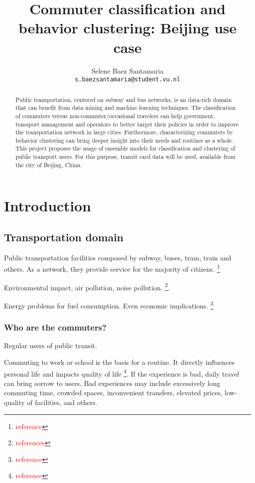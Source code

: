 \documentclass{article}
\title{Commuter classification and behavior clustering: Beijing use case}
\author{
  Selene Baez  Santamaria \\
  \texttt{s.baezsantamaria@student.vu.nl}
}
\newcommand{\selfnote}[1]{\footnote{\textcolor{red}{#1}}}
\begin{document}

\maketitle

\begin{abstract}
  Public transportation, centered on subway and bus networks, is an data-rich domain that can benefit from data mining and machine learning techniques. The classification of commuters versus non-commuter/occasional travelers can help government, transport management and operators to better target their policies in order to improve the transportation network in large cities. Furthermore, characterizing commuters by behavior clustering can bring deeper insight into their needs and routines as a whole. 
  This project proposes the usage of ensemble models for classification and clustering of public transport users. For this purpose, transit card data will be used, available from the city of Beijing, China. 
\end{abstract}

\newpage

\tableofcontents

\newpage
\section{Introduction}

\subsection{Transportation domain}
Public transportation facilities composed by subway, buses, tram, train and others. As a network, they provide service for the majority of citizens. \selfnote{reference}  

Environmental impact, air pollution, noise pollution. \selfnote{references}. 

Energy problems for fuel consumption. Even economic implications. \selfnote{reference}


\subsubsection{Who are the commuters?}
Regular users of public transit. 

Commuting to work or school is the basis for a routine. It directly influences personal life and impacts quality of life \selfnote{reference}. If the experience is bad, daily travel can bring sorrow to users. Bad experiences may include excessively long commuting time, crowded spaces, inconvenient transfers, elevated prices, low-quality of facilities, and others. 
\end{document}
